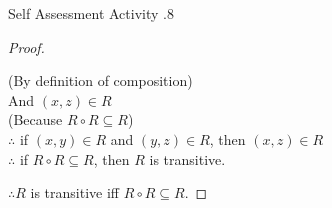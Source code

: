 \documentclass[../notes.tex]{subfiles}
\begin{document}
\begin{exercise}{Self Assessment Activity \thechapter.8}
\begin{enumerate}
\begin{proof}
\begin{enumerate}[label=(\roman*)]
\begin{subproof}[Subproof]
\begin{tabbing}
												\> (By definition of composition)\\
												And \> $(x, z) \in R$\\
												\> (Because $R \circ R \subseteq R$)\\
												$\therefore$ \> if $(x, y) \in R$ and $(y, z) \in R$, then $(x, z) \in R$\\
												$\therefore$ \> if $R \circ R \subseteq R$, then $R$ is transitive.
											\end{tabbing}
										\end{subproof}
								\end{enumerate}
								$\therefore R$ is transitive iff $R \circ R \subseteq R$.
							\end{proof}
					\end{enumerate}
				\end{exercise}
\end{document}
